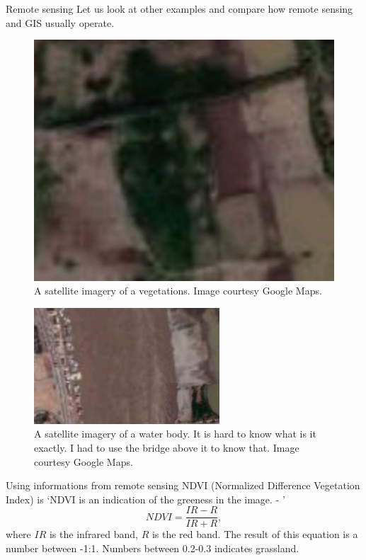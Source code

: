 \documentclass{beamer}
\begin{document}
\begin{frame}{Remote sensing}
  Let us look at other examples and compare how remote sensing and GIS usually
  operate.

  \begin{figure}
    \begin{minipage}{.5\linewidth}
      \includegraphics[width=0.5\linewidth]{images/google-maps-street-2}
      \caption{A satellite imagery of a vegetations. Image courtesy Google Maps.}
    \end{minipage}
  \end{figure}

  \begin{minipage}{.5\linewidth}
    \begin{figure}
      \includegraphics[width=0.5\linewidth]{images/google-maps-street-3}
      \caption{A satellite imagery of a water body. It is hard to know what is
        it exactly. I had to use the bridge above it to know that. Image
        courtesy Google Maps.}
    \end{figure}
  \end{minipage}
\end{frame}

\begin{frame}{Using informations from remote sensing}
  NDVI (Normalized Difference Vegetation Index) is
  `NDVI is an indication of the greeness in the image. - \cite{arcgis-docs-ndvi}'
  \begin{equation}
    \label{eq:ndvi}
    NDVI = \frac{IR - R}{IR + R}, 
  \end{equation}
  where $IR$ is the infrared band, $R$ is the red band. The result of this
  equation is a number between -1:1. Numbers between  0.2-0.3 indicates grassland.
  
  
\end{frame}
\end{document}
